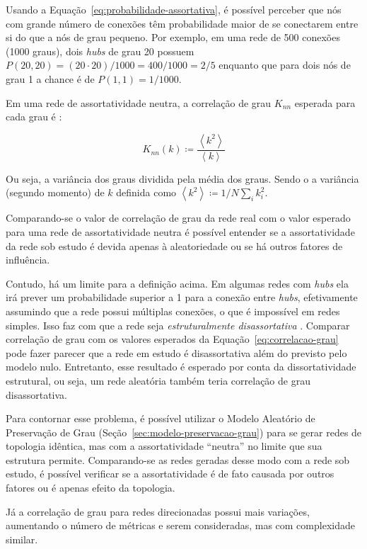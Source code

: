 \documentclass[12pt,a4paper]{article}
\theoremstyle{hypo}
\newcommand{\avg}[1]{\left\langle #1 \right\rangle} %
\newcommand{\defn}{\coloneqq} %
\begin{document}
Usando a Equação~\ref{eq:probabilidade-assortativa}, é possível perceber que nós com grande número de conexões têm probabilidade maior de se conectarem entre si do que a nós de grau pequeno. Por exemplo, em uma rede de 500 conexões (1000 graus), dois \textit{hubs} de grau 20 possuem $P(20, 20) = (20 \cdot 20) / 1000 = 400 / 1000 = 2 / 5$ enquanto que para dois nós de grau 1 a chance é de $P(1, 1) = 1 / 1000$.

Em uma rede de assortatividade neutra, a correlação de grau $K_\textit{nn}$ esperada para cada grau é \cite{Barabasi2016-rn}:

\begin{equation} \label{eq:correlacao-grau}
K_\textit{nn}(k) \defn \frac{\avg{k^2}}{\avg{k}}
\end{equation}

Ou seja, a variância dos graus dividida pela média dos graus. Sendo o a variância (segundo momento) de $k$ definida como $\avg{k^2} \defn 1/N \sum_i k_i^2$.

Comparando-se o valor de correlação de grau da rede real com o valor esperado para uma rede de assortatividade neutra é possível entender se a assortatividade da rede sob estudo é devida apenas à aleatoriedade ou se há outros fatores de influência.

Contudo, há um limite para a definição acima. Em algumas redes com \textit{hubs} ela irá prever um probabilidade superior a 1 para a conexão entre \textit{hubs}, efetivamente assumindo que a rede possui múltiplas conexões, o que é impossível em redes simples. Isso faz com que a rede seja \textit{estruturalmente disassortativa} \cite{Barabasi2016-rn}. Comparar correlação de grau com os valores esperados da Equação~\ref{eq:correlacao-grau} pode fazer parecer que a rede em estudo é disassortativa além do previsto pelo modelo nulo. Entretanto, esse resultado é esperado por conta da dissortatividade estrutural, ou seja, um rede aleatória também teria correlação de grau disassortativa.

Para contornar esse problema, é possível utilizar o Modelo Aleatório de Preservação de Grau (Seção~\ref{sec:modelo-preservacao-grau}) para se gerar redes de topologia idêntica, mas com a assortatividade \enquote{neutra} no limite que sua estrutura permite. Comparando-se as redes geradas desse modo com a rede sob estudo, é possível verificar se a assortatividade é de fato causada por outros fatores ou é apenas efeito da topologia.

Já a correlação de grau para redes direcionadas possui mais variações, aumentando o número de métricas e serem consideradas, mas com complexidade similar.
\end{document}
